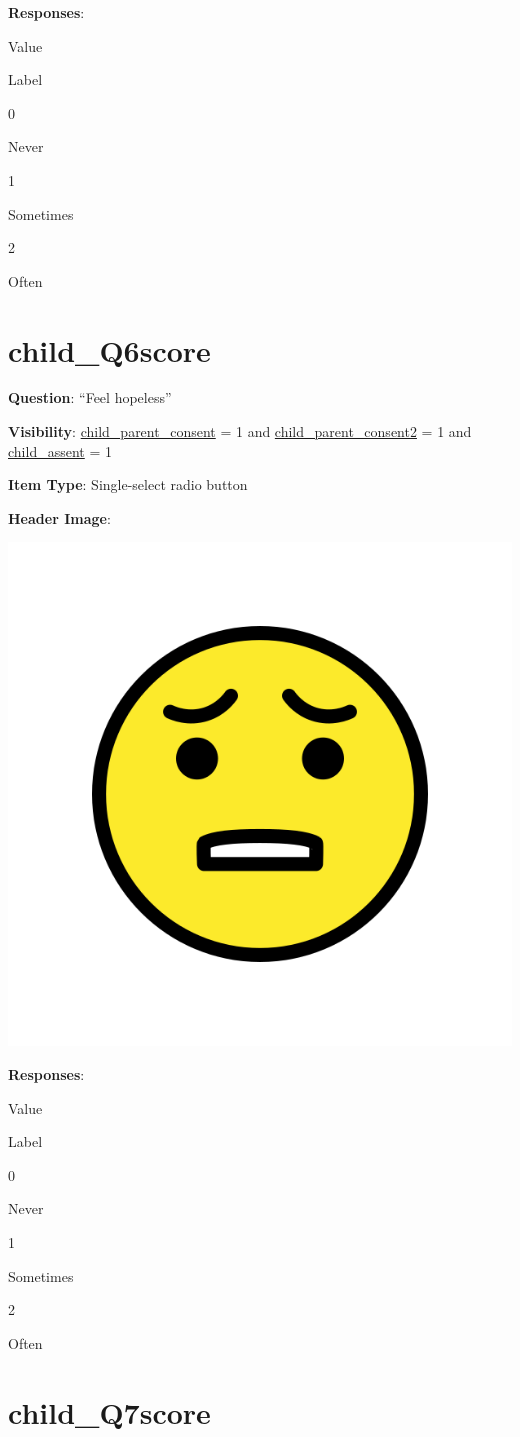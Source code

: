 \documentclass[]{book}
\begin{document}
\textbf{Responses}:

Value

Label

0

Never

1

Sometimes

2

Often

\hypertarget{child_q6score}{%
\section{child\_Q6score}\label{child_q6score}}

\textbf{Question}: ``Feel hopeless''

\textbf{Visibility}: \protect\hyperlink{child_parent_consent}{child\_parent\_consent} = 1 and \protect\hyperlink{child_parent_consent2}{child\_parent\_consent2} = 1 and \protect\hyperlink{child_assent}{child\_assent} = 1

\textbf{Item Type}: Single-select radio button

\textbf{Header Image}:

\begin{flushleft}\includegraphics[width=0.33\linewidth]{downloadFigs4latex_HBN_PMHS_Codebook/child_Q6score_headerImg} \end{flushleft}

\textbf{Responses}:

Value

Label

0

Never

1

Sometimes

2

Often

\hypertarget{child_q7score}{%
\section{child\_Q7score}\label{child_q7score}}
\end{document}
